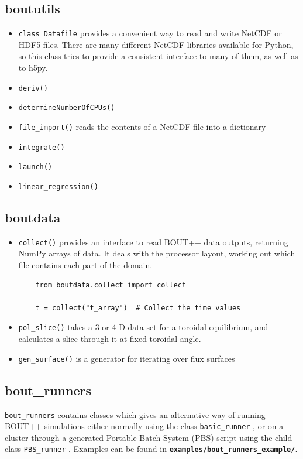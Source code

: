 \documentclass[12pt]{article}
\newcommand{\file}[1]{\texttt{\bf #1}}
\begin{document}
\subsection{boututils}
%
\begin{itemize}
\item
%
\lstinline!class Datafile!
%
 provides a convenient way to read and write NetCDF or HDF5 files. There are
 many different NetCDF libraries available for Python, so this class tries to
 provide a consistent interface to many of them, as well as to h5py.
\item
%
\lstinline!deriv()!
%
\item
%
\lstinline!determineNumberOfCPUs()!
%
\item
%
\lstinline!file_import()!
%
 reads the contents of a NetCDF file into a dictionary
\item
%
\lstinline!integrate()!
%
\item
%
\lstinline!launch()!
%
\item
%
\lstinline!linear_regression()!
%
\end{itemize}
%



\subsection{boutdata}
%
\begin{itemize}
\item
%
\lstinline!collect()!
%
 provides an interface to read BOUT++ data outputs, returning NumPy arrays of
 data.  It deals with the processor layout, working out which file contains
 each part of the domain.
  \begin{lstlisting}
    from boutdata.collect import collect

    t = collect("t_array")  # Collect the time values
  \end{lstlisting}
%
\item
%
\lstinline!pol_slice()!
%
 takes a 3 or 4-D data set for a toroidal equilibrium, and calculates a slice
 through it at fixed toroidal angle.
\item
%
\lstinline!gen_surface()!
%
 is a generator for iterating over flux surfaces
\end{itemize}
%



\subsection{bout\_runners}
%
\label{sec:bout_runners}
%
\lstinline!bout_runners!
%
contains classes which gives an alternative way of running BOUT++ simulations
either normally using the class
%
\lstinline!basic_runner!
%
, or on a cluster through a generated Portable Batch System (PBS) script using
the child class
%
\lstinline!PBS_runner!
%
. Examples can be found in \file{examples/bout\_runners\_example/}.
\end{document}
